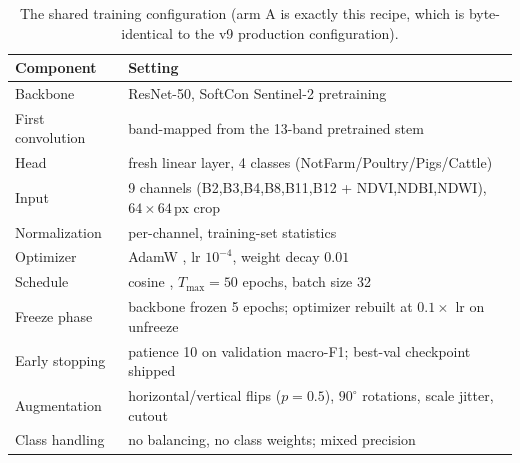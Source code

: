 \documentclass[11pt,a4paper]{article}
\begin{document}
\begin{table}[t]
\centering
\small
\caption{The shared training configuration (arm A is exactly this recipe, which
is byte-identical to the v9 production configuration).}
\label{tab:r4recipe}
\begin{tabular}{ll}
\toprule
Component & Setting \\
\midrule
Backbone & ResNet-50, SoftCon Sentinel-2 pretraining \citep{wang2024softcon} \\
First convolution & band-mapped from the 13-band pretrained stem \\
Head & fresh linear layer, 4 classes (NotFarm/Poultry/Pigs/Cattle) \\
Input & 9 channels (B2,B3,B4,B8,B11,B12 + NDVI,NDBI,NDWI), $64{\times}64$\,px crop \\
Normalization & per-channel, training-set statistics \\
Optimizer & AdamW \citep{loshchilov2019adamw}, lr $10^{-4}$, weight decay $0.01$ \\
Schedule & cosine \citep{loshchilov2017sgdr}, $T_{\max}=50$ epochs, batch size 32 \\
Freeze phase & backbone frozen 5 epochs; optimizer rebuilt at $0.1\times$ lr on unfreeze \\
Early stopping & patience 10 on validation macro-F1; best-val checkpoint shipped \\
Augmentation & horizontal/vertical flips ($p{=}0.5$), $90^\circ$ rotations, scale jitter, cutout \citep{devries2017cutout} \\
Class handling & no balancing, no class weights; mixed precision \\
\bottomrule
\end{tabular}
\end{table}
\end{document}
